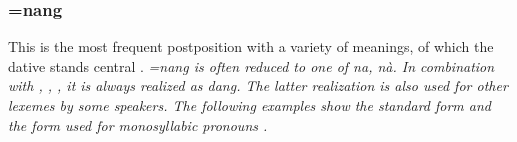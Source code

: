  
 

% 
% 



\subsubsection{=nang}\label{sec:morph:=nang}
This is the most frequent postposition with a variety of meanings, of which the dative stands central
\citep{Ansaldo2005ms,%
Ansaldo2008genesis, %
Ansaldo2009,
Slomanson2007cll,%
Slomanson2008lingua}.
\em =nang \em is often reduced to one of \em na, nà\em.  In combination with , , ,  it is always realized as \em dang\em. The latter realization is also used for other lexemes by some speakers. The following examples show the standard form  and the form used for monosyllabic pronouns .


